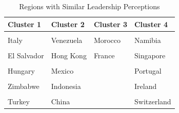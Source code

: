 \documentclass[
]{article}
\begin{document}
\begin{table}[h]

\caption{\label{tab:unnamed-chunk-6}Regions with Similar Leadership Perceptions}
\centering
\begin{tabular}[t]{>{}l>{}l>{}l>{}l}
\toprule
Cluster 1 & Cluster 2 & Cluster 3 & Cluster 4\\
\midrule
\textcolor[HTML]{739999}{\cellcolor{gray!6}{Costa Rica}} & \textcolor[HTML]{000026}{\cellcolor{gray!6}{India}} & \textcolor[HTML]{407326}{\cellcolor{gray!6}{Qatar}} & \textcolor[HTML]{BF7300}{\cellcolor{gray!6}{England}}\\
\textcolor[HTML]{739999}{Italy} & \textcolor[HTML]{000026}{Venezuela} & \textcolor[HTML]{407326}{Morocco} & \textcolor[HTML]{BF7300}{Namibia}\\
\textcolor[HTML]{739999}{\cellcolor{gray!6}{Ecuador}} & \textcolor[HTML]{000026}{\cellcolor{gray!6}{Taiwan}} & \textcolor[HTML]{407326}{\cellcolor{gray!6}{South Africa (Black Sample)}} & \textcolor[HTML]{BF7300}{\cellcolor{gray!6}{Czech Republic}}\\
\textcolor[HTML]{739999}{El Salvador} & \textcolor[HTML]{000026}{Hong Kong} & \textcolor[HTML]{407326}{France} & \textcolor[HTML]{BF7300}{Singapore}\\
\textcolor[HTML]{739999}{\cellcolor{gray!6}{Israel}} & \textcolor[HTML]{000026}{\cellcolor{gray!6}{Iran}} & \textcolor[HTML]{407326}{\cellcolor{gray!6}{}} & \textcolor[HTML]{BF7300}{\cellcolor{gray!6}{Kazakhstan}}\\
\addlinespace
\textcolor[HTML]{739999}{Hungary} & \textcolor[HTML]{000026}{Mexico} & \textcolor[HTML]{407326}{} & \textcolor[HTML]{BF7300}{Portugal}\\
\textcolor[HTML]{739999}{\cellcolor{gray!6}{Zambia}} & \textcolor[HTML]{000026}{\cellcolor{gray!6}{Russia}} & \textcolor[HTML]{407326}{\cellcolor{gray!6}{}} & \textcolor[HTML]{BF7300}{\cellcolor{gray!6}{Finland}}\\
\textcolor[HTML]{739999}{Zimbabwe} & \textcolor[HTML]{000026}{Indonesia} & \textcolor[HTML]{407326}{} & \textcolor[HTML]{BF7300}{Ireland}\\
\textcolor[HTML]{739999}{\cellcolor{gray!6}{Colombia}} & \textcolor[HTML]{000026}{\cellcolor{gray!6}{South Korea}} & \textcolor[HTML]{407326}{\cellcolor{gray!6}{}} & \textcolor[HTML]{BF7300}{\cellcolor{gray!6}{Austria}}\\
\textcolor[HTML]{739999}{Turkey} & \textcolor[HTML]{000026}{China} & \textcolor[HTML]{407326}{} & \textcolor[HTML]{BF7300}{Switzerland}\\

\end{tabular}
\end{table}
\end{document}
